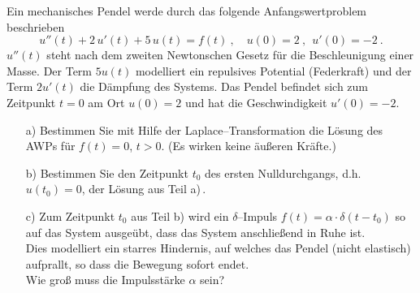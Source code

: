 {
Ein mechanisches Pendel werde durch das folgende Anfangswertproblem beschrieben
	\[
	u''(t) + 2\,u'(t)+5\,u(t) = f(t)\ ,\quad u(0)=2\ ,\ \ u'(0)=-2 \ .
\]
$u''(t)$ steht nach dem zweiten Newtonschen Gesetz f\"ur die Beschleunigung einer Masse. Der Term $5u(t)$ modelliert ein repulsives Potential (Federkraft) und der Term $2u'(t)$ die D\"ampfung des Systems. Das Pendel befindet sich zum Zeitpunkt $t=0$ am Ort $u(0)=2$ und hat die Geschwindigkeit $u'(0)=-2$.   
\begin{itemize}
\item[a)]  Bestimmen Sie mit Hilfe der Laplace--Transformation die L\"osung des AWPs f\"ur $f(t) = 0$, $t>0$. (Es wirken keine \"außeren Kr\"afte.)
\item[b)]  Bestimmen Sie den Zeitpunkt $t_0$ des ersten Nulldurchgangs, d.h.\ $u(t_0)=0$, der L\"osung aus Teil a)\,.
\item[c)]  Zum Zeitpunkt $t_0$ aus Teil b) wird ein $\delta$--Impuls $f(t) 
=\alpha\cdot\delta(t-t_0)$ so auf das System ausge\"ubt, dass das System anschließend in Ruhe ist. \\
Dies modelliert ein starres Hindernis, auf welches das Pendel (nicht elastisch) aufprallt, so dass die Bewegung sofort endet. \\
Wie groß muss die Impulsst\"arke $\alpha$ sein?
\end{itemize}
}
